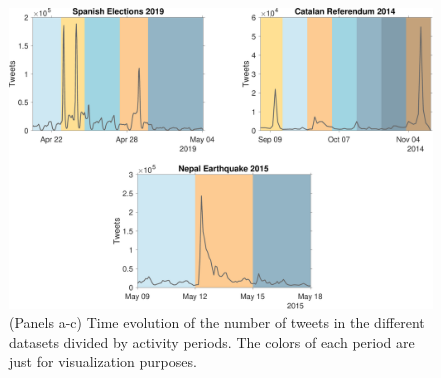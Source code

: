 \begin{figure}[t]
   \includegraphics[width=1\textwidth]{figures/chp3/fig4a.pdf}
   
    \caption[Time evolution of the number of tweets by activity periods]{(Panels a-c) Time evolution of the number of tweets in the different datasets divided by activity periods. The colors of each period are just for visualization purposes.}
   \label{chp3:fig:4a}
\end{figure}


